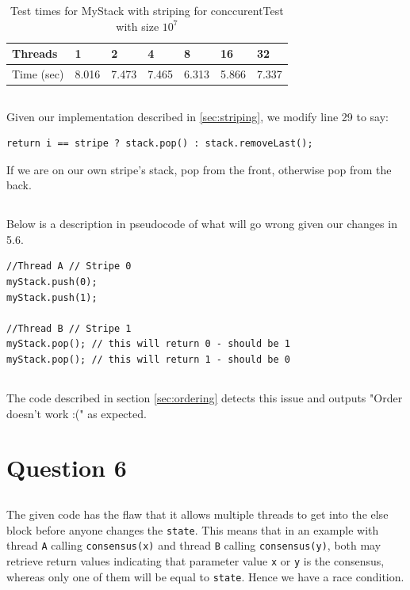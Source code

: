 \documentclass[a5paper]{article}
\begin{document}
\begin{table}[ht!]
\centering
\begin{tabular}{|l|l|l|l|l|l|l|}
\hline
Threads & 1 & 2 & 4 & 8 & 16 & 32 \\ \hline
Time (sec) & 8.016 & 7.473 & 7.465 & 6.313 & 5.866 & 7.337 \\ \hline
\end{tabular}
\caption{Test times for MyStack with striping for conccurentTest with size $10^7$}
\label{table:striping}
\end{table}

\subsection{}
Given our implementation described in \ref{sec:striping}, we modify line 29 to say:
\begin{lstlisting}
return i == stripe ? stack.pop() : stack.removeLast();
\end{lstlisting}
If we are on our own stripe's stack, pop from the front, otherwise pop from the back.

\subsection{}
Below is a description in pseudocode of what will go wrong given our changes in 5.6.

\begin{lstlisting}
//Thread A // Stripe 0
myStack.push(0);
myStack.push(1);

//Thread B // Stripe 1
myStack.pop(); // this will return 0 - should be 1
myStack.pop(); // this will return 1 - should be 0
\end{lstlisting}

\subsection{}
The code described in section \ref{sec:ordering} detects this issue and outputs "Order doesn't work :(" as expected.

\section{Question 6}
\subsection{}
The given code has the flaw that it allows multiple threads to get into the else block before anyone changes the \texttt{state}.
This means that in an example with thread \texttt{A} calling \texttt{consensus(x)} and thread \texttt{B} calling \texttt{consensus(y)}, both may retrieve return values
indicating that parameter value \texttt{x} or \texttt{y} is the consensus, whereas only one of them will be equal to \texttt{state}. Hence we have a race condition.
\end{document}
